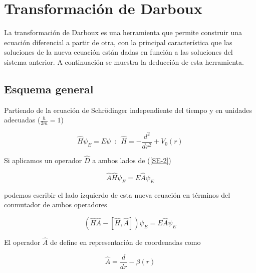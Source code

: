 
\chapter{Transformación de Darboux}

La transformación de Darboux es una herramienta que permite construir una ecuación diferencial a partir de otra, con la principal característica que las soluciones de la nueva ecuación están dadas en función a las soluciones del sistema anterior. A continuación se muestra la deducción de esta herramienta.

\section{Esquema general}

Partiendo de la ecuación de Schrödinger independiente del tiempo y en unidades adecuadas ($\frac{\hbar}{2m}=1$)

\begin{equation}
\hat{H}\psi_E = E \psi\,\,\, : \,\,\,\hat{H} = -\frac{d^2}{dr^2}	+ V_0(r)  \label{SE-2}
\end{equation}

Si aplicamos un operador $\hat {D}$ a ambos lados de (\ref{SE-2})

\begin{equation*}
\hat{A}\hat{H}\psi_E = E \hat{A}\psi_E
\end{equation*}

podemos escribir el lado izquierdo de esta nueva ecuación en términos del conmutador de ambos operadores

\begin{equation}
  (\hat{H}\hat{A} - [\hat{H},\hat{A}])\psi_E = E \hat{A}\psi_E \label{nSE}
\end{equation}

El operador $\hat{A}$ de define en representación de coordenadas como

\begin{equation*}
	\hat{A} = \frac{d}{dr} - \beta(r)
\end{equation*}


